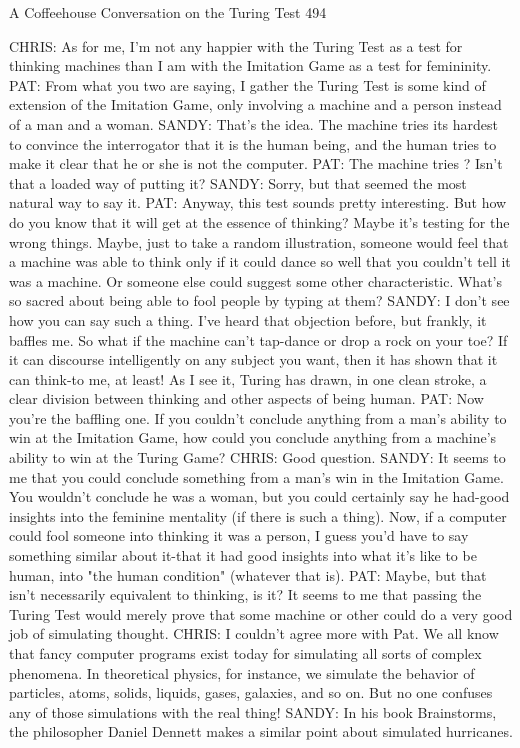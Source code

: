 A Coffeehouse Conversation on the Turing Test                                      494

CHRIS: As for me, I'm not any happier with the Turing Test as a test for thinking
   machines than I am with the Imitation Game as a test for femininity.
PAT: From what you two are saying, I gather the Turing Test is some kind of
   extension of the Imitation Game, only involving a machine and a person instead
   of a man and a woman.
SANDY: That's the idea. The machine tries its hardest to convince the interrogator
   that it is the human being, and the human tries to make it clear that he or she is
   not the computer.
PAT: The machine tries ? Isn't that a loaded way of putting it?
SANDY: Sorry, but that seemed the most natural way to say it.
PAT: Anyway, this test sounds pretty interesting. But how do you know that it will
   get at the essence of thinking? Maybe it's testing for the wrong things. Maybe,
   just to take a random illustration, someone would feel that a machine was able to
   think only if it could dance so well that you couldn't tell it was a machine. Or
   someone else could suggest some other characteristic. What's so sacred about
   being able to fool people by typing at them?
SANDY: I don't see how you can say such a thing. I've heard that objection before,
   but frankly, it baffles me. So what if the machine can't tap-dance or drop a rock
   on your toe? If it can discourse intelligently on any subject you want, then it has
   shown that it can think-to me, at least! As I see it, Turing has drawn, in one clean
   stroke, a clear division between thinking and other aspects of being human.
PAT: Now you're the baffling one. If you couldn't conclude anything from a man's
   ability to win at the Imitation Game, how could you conclude anything from a
   machine's ability to win at the Turing Game?
CHRIS: Good question.
SANDY: It seems to me that you could conclude something from a man's win in the
   Imitation Game. You wouldn't conclude he was a woman, but you could
   certainly say he had-good insights into the feminine mentality (if there is such a
   thing). Now, if a computer could fool someone into thinking it was a person, I
   guess you'd have to say something similar about it-that it had good insights into
   what it's like to be human, into "the human condition" (whatever that is).
PAT: Maybe, but that isn't necessarily equivalent to thinking, is it? It seems to me that
   passing the Turing Test would merely prove that some machine or other could do
   a very good job of simulating thought.
CHRIS: I couldn't agree more with Pat. We all know that fancy computer programs
   exist today for simulating all sorts of complex phenomena. In theoretical physics,
   for instance, we simulate the behavior of particles, atoms, solids, liquids, gases,
   galaxies, and so on. But no one confuses any of those simulations with the real
   thing!
SANDY: In his book Brainstorms, the philosopher Daniel Dennett makes a similar
   point about simulated hurricanes.




